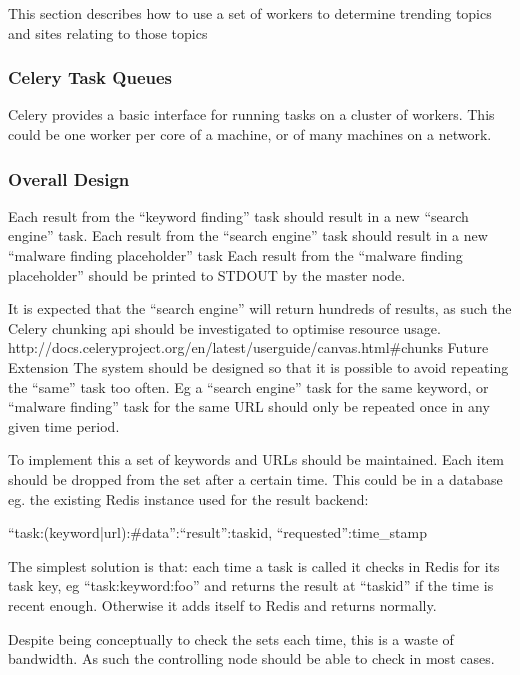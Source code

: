 This section describes how to use a set of workers to determine trending topics and sites relating to those topics

\begin{comment}
python, pip and PyPi
HTML/XML, RSS and JSON parsing
OAuth2
Celery basics
\end{comment}

\subsubsection{Celery Task Queues}
Celery provides a basic interface for running tasks on a cluster of workers. This could be one worker per core of a machine, or of many machines on a network.

\subsubsection{Overall Design}
Each result from the ``keyword finding'' task should result in a new ``search engine'' task.
Each result from the ``search engine'' task should result in a new ``malware finding placeholder'' task
Each result from the ``malware finding placeholder'' should be printed to STDOUT by the master node.

It is expected that the ``search engine'' will return hundreds of results, as such the Celery chunking api should be investigated to optimise resource usage. http://docs.celeryproject.org/en/latest/userguide/canvas.html#chunks
Future Extension
The system should be designed so that it is possible to avoid repeating the ``same'' task too often. Eg a ``search engine'' task for the same keyword, or ``malware finding'' task for the same URL should only be repeated once in any given time period.

To implement this a set of keywords and URLs should be maintained. Each item should be dropped from the set after a certain time. This could be in a database eg. the existing Redis instance used for the result backend:

{``task:(keyword|url):#{data}'':{``result'':taskid, ``requested'':time_stamp}}

The simplest solution is that: each time a task is called it checks in Redis for its task key, eg ``task:keyword:foo'' and returns the result at ``taskid'' if the time is recent enough. Otherwise it adds itself to Redis and returns normally.

Despite being conceptually to check the sets each time, this is a waste of bandwidth. As such the controlling node should be able to check in most cases.

